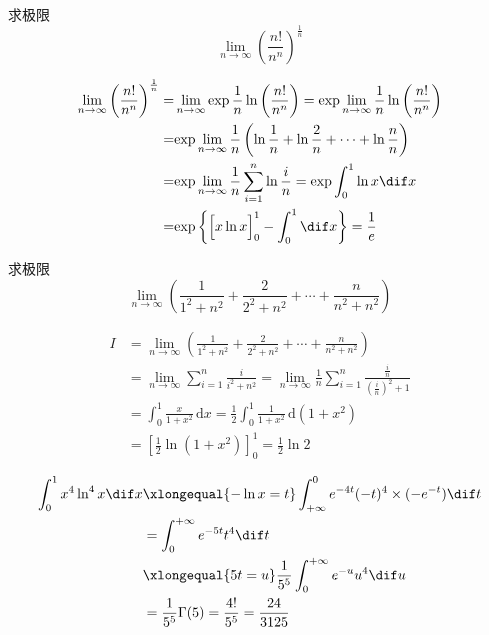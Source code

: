 \documentclass[color=green,titlestyle=hang]{elegantbook}%
\begin{document}
\begin{exercise}
求极限\begin{equation*}\lim_{n\to\infty}\left(\frac{n!}{n^n}\right)^{\frac{1}{n}}\end{equation*}
\end{exercise}
\begin{Solution}
\begin{align*}
\lim\limits_{n \to \infty } {\left( {\frac{{n!}}{{{n^n}}}} \right)^{\frac{1}{n}}} =& \lim\limits_{n \to \infty } {\exp{\frac{1}{n}\ln\left( {\frac{{n!}}{{{n^n}}}} \right)}}
= {\exp{\lim\limits_{n \to \infty } \frac{1}{n}\ln\left( {\frac{{n!}}{{{n^n}}}} \right)}}\\
= &{\exp{\lim\limits_{n \to \infty } \frac{1}{n}\left( {\ln\frac{1}{n} + \ln \frac{2}{n} +  \cdots  + \ln \frac{n}{n}} \right)}} \\
=& {\exp{\lim\limits_{n \to \infty } \frac{1}{n}\sum\limits_{i = 1}^n {\ln\frac{i}{n}} }}= {\displaystyle \exp{\int_0^1 {\ln x} \dif x}}\\
=&{\exp\bigg\{\Big[x\ln x\Big]_{0}^{1}-\int_0^1\dif x}\bigg\}=\frac{1}{e}
\end{align*}	
\end{Solution}

\begin{exercise}
求极限\begin{equation*}\lim_{n\to\infty}\left(\frac{1}{1^2+n^2}+\frac{2}{2^2+n^2}+\cdots+\frac{n}{n^2+n^2}\right)\end{equation*}
\end{exercise}\begin{Solution}
\begin{align*}I&=\lim_{n\to\infty}\left(\frac{1}{1^2+n^2}+\frac{2}{2^2+n^2}+\cdots+\frac{n}{n^2+n^2}\right)\\
&=\lim_{n\to\infty}\sum_{i=1}^{n}\frac{i}{i^2+n^2}=\lim_{n\to\infty}\frac{1}{n}\sum_{i=1}^{n}\frac{\frac{i}{n}}{\left(\frac{i}{n}\right)^2+1}\\
&=\int_{0}^{1}\frac{x}{1+x^2}\,\mathrm{d}x=\frac{1}{2}\int_{0}^{1}\frac{1}{1+x^2}\,\mathrm{d}(1+x^2)\\
&=\left[\frac{1}{2}\ln(1+x^2)\right]_{0}^{1}=\frac{1}{2}\ln2	
\end{align*}
\end{Solution}

\begin{align*}
\int_0^1x^4\ln^4x\dif x
&\xlongequal{-\ln x=t}\int_{+\infty}^0e^{-4t}(-t)^4\times(-e^{-t})\dif  t\\
&=\int_0^{+\infty}e^{-5t}t^4\dif  t\\
&\xlongequal{5t=u}\frac{1}{5^5}\int_0^{+\infty}e^{-u}u^4\dif  u\\
&=\frac{1}{5^5}\Gamma(5)=\frac{4!}{5^5}=\frac{24}{3125}
\end{align*}
\end{document}
